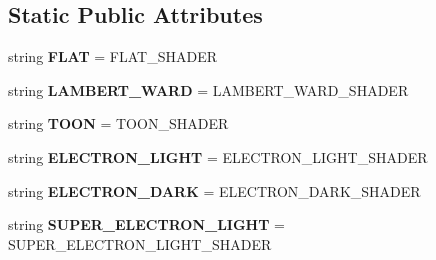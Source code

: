 \subsection*{Static Public Attributes}
\begin{DoxyCompactItemize}
\item 
string {\bfseries F\+L\+AT} = \textquotesingle{}F\+L\+A\+T\+\_\+\+S\+H\+A\+D\+ER\textquotesingle{}\hypertarget{classmeshy_1_1neuromorphovis_1_1enums_1_1shading__enums_1_1Shading_adad8437bb3d6745f66f83fa0a42cdc5d}{}\label{classmeshy_1_1neuromorphovis_1_1enums_1_1shading__enums_1_1Shading_adad8437bb3d6745f66f83fa0a42cdc5d}

\item 
string {\bfseries L\+A\+M\+B\+E\+R\+T\+\_\+\+W\+A\+RD} = \textquotesingle{}L\+A\+M\+B\+E\+R\+T\+\_\+\+W\+A\+R\+D\+\_\+\+S\+H\+A\+D\+ER\textquotesingle{}\hypertarget{classmeshy_1_1neuromorphovis_1_1enums_1_1shading__enums_1_1Shading_a8213fae7d724e080f7f58f46b918469b}{}\label{classmeshy_1_1neuromorphovis_1_1enums_1_1shading__enums_1_1Shading_a8213fae7d724e080f7f58f46b918469b}

\item 
string {\bfseries T\+O\+ON} = \textquotesingle{}T\+O\+O\+N\+\_\+\+S\+H\+A\+D\+ER\textquotesingle{}\hypertarget{classmeshy_1_1neuromorphovis_1_1enums_1_1shading__enums_1_1Shading_a2c61ea71f357c5f9840ba495381aa38f}{}\label{classmeshy_1_1neuromorphovis_1_1enums_1_1shading__enums_1_1Shading_a2c61ea71f357c5f9840ba495381aa38f}

\item 
string {\bfseries E\+L\+E\+C\+T\+R\+O\+N\+\_\+\+L\+I\+G\+HT} = \textquotesingle{}E\+L\+E\+C\+T\+R\+O\+N\+\_\+\+L\+I\+G\+H\+T\+\_\+\+S\+H\+A\+D\+ER\textquotesingle{}\hypertarget{classmeshy_1_1neuromorphovis_1_1enums_1_1shading__enums_1_1Shading_a52be17362ee70e8e31f489157e2903d4}{}\label{classmeshy_1_1neuromorphovis_1_1enums_1_1shading__enums_1_1Shading_a52be17362ee70e8e31f489157e2903d4}

\item 
string {\bfseries E\+L\+E\+C\+T\+R\+O\+N\+\_\+\+D\+A\+RK} = \textquotesingle{}E\+L\+E\+C\+T\+R\+O\+N\+\_\+\+D\+A\+R\+K\+\_\+\+S\+H\+A\+D\+ER\textquotesingle{}\hypertarget{classmeshy_1_1neuromorphovis_1_1enums_1_1shading__enums_1_1Shading_a2525d77bac01ba477f3fd1acdb29980d}{}\label{classmeshy_1_1neuromorphovis_1_1enums_1_1shading__enums_1_1Shading_a2525d77bac01ba477f3fd1acdb29980d}

\item 
string {\bfseries S\+U\+P\+E\+R\+\_\+\+E\+L\+E\+C\+T\+R\+O\+N\+\_\+\+L\+I\+G\+HT} = \textquotesingle{}S\+U\+P\+E\+R\+\_\+\+E\+L\+E\+C\+T\+R\+O\+N\+\_\+\+L\+I\+G\+H\+T\+\_\+\+S\+H\+A\+D\+ER\textquotesingle{}\hypertarget{classmeshy_1_1neuromorphovis_1_1enums_1_1shading__enums_1_1Shading_aa83c7dc876437f34b450aacb35cdb68a}{}\label{classmeshy_1_1neuromorphovis_1_1enums_1_1shading__enums_1_1Shading_aa83c7dc876437f34b450aacb35cdb68a}


\end{DoxyCompactItemize}
